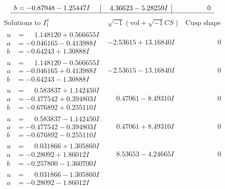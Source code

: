\documentclass[1p]{elsarticle_modified}
\theoremstyle{definition}
\newcommand{\I}{\sqrt{-1}}
\begin{document}
$$\begin{array}{c|c|c}
\begin{aligned}
b &= -0.87948 - 1.25447 I\end{aligned}
 & \phantom{-}4.36623 - 5.28259 I & \phantom{-0.000000 } 0\\
 \hline 
 \end{array}$$\newpage$$\begin{array}{c|c|c}  
\text{Solutions to }I^u_{1}& \I (\text{vol} + \sqrt{-1}CS) & \text{Cusp shape}\\
 \hline 
\begin{aligned}
u &= \phantom{-}1.148120 + 0.566655 I \\
a &= -0.046165 - 0.413988 I \\
b &= -0.64243 + 1.30888 I\end{aligned}
 & -2.53615 + 13.16840 I & \phantom{-0.000000 } 0 \\ \hline\begin{aligned}
u &= \phantom{-}1.148120 - 0.566655 I \\
a &= -0.046165 + 0.413988 I \\
b &= -0.64243 - 1.30888 I\end{aligned}
 & -2.53615 - 13.16840 I & \phantom{-0.000000 } 0 \\ \hline\begin{aligned}
u &= \phantom{-}0.583837 + 1.142450 I \\
a &= -0.477542 + 0.394803 I \\
b &= -0.676892 + 0.255110 I\end{aligned}
 & \phantom{-}0.47061 - 8.49310 I & \phantom{-0.000000 } 0 \\ \hline\begin{aligned}
u &= \phantom{-}0.583837 - 1.142450 I \\
a &= -0.477542 - 0.394803 I \\
b &= -0.676892 - 0.255110 I\end{aligned}
 & \phantom{-}0.47061 + 8.49310 I & \phantom{-0.000000 } 0 \\ \hline\begin{aligned}
u &= \phantom{-}0.031866 + 1.305860 I \\
a &= -0.28092 + 1.86012 I \\
b &= -0.257800 - 1.360700 I\end{aligned}
 & \phantom{-}8.53653 - 4.24665 I & \phantom{-0.000000 } 0 \\ \hline\begin{aligned}
u &= \phantom{-}0.031866 - 1.305860 I \\
a &= -0.28092 - 1.86012 I \\

\end{aligned}
\end{array}$$
\end{document}
